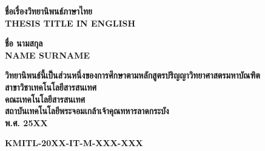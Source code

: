\documentclass[12pt,a4paper]{report}
\begin{document}
\begin{titlepage}
\begin{center}
    {\fontsize{20pt}{24pt}\selectfont \textbf{ชื่อเรื่องวิทยานิพนธ์ภาษาไทย}}\\
    \vspace{0.5cm}
    {\fontsize{20pt}{24pt}\selectfont \textbf{THESIS TITLE IN ENGLISH}}\\
    
    \vspace{2.5cm}
    
    {\fontsize{18pt}{22pt}\selectfont \textbf{ชื่อ นามสกุล}}\\
    {\fontsize{18pt}{22pt}\selectfont \textbf{NAME SURNAME}}\\
    
    \vfill
    
    {\fontsize{18pt}{22pt}\selectfont \textbf{วิทยานิพนธ์นี้เป็นส่วนหนึ่งของการศึกษาตามหลักสูตรปริญญาวิทยาศาสตรมหาบัณฑิต}}\\
    {\fontsize{18pt}{22pt}\selectfont \textbf{สาขาวิชาเทคโนโลยีสารสนเทศ}}\\
    {\fontsize{18pt}{22pt}\selectfont \textbf{คณะเทคโนโลยีสารสนเทศ}}\\
    {\fontsize{18pt}{22pt}\selectfont \textbf{สถาบันเทคโนโลยีพระจอมเกล้าเจ้าคุณทหารลาดกระบัง}}\\
    {\fontsize{18pt}{22pt}\selectfont \textbf{พ.ศ. 25XX}}\\
    
    \vspace{1.5cm}
    
    {\fontsize{16pt}{20pt}\selectfont \textbf{KMITL-20XX-IT-M-XXX-XXX}}
\end{center}
\end{titlepage}
\end{document}
